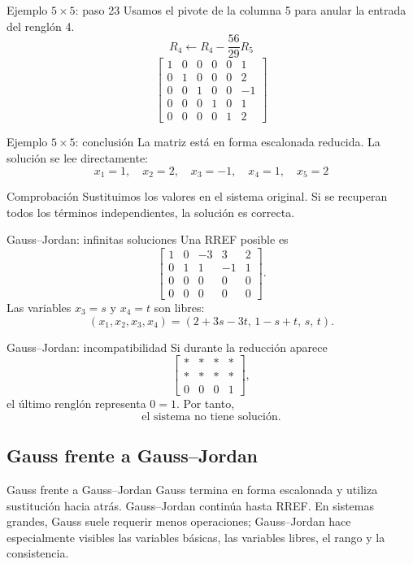 \documentclass[aspectratio=169,9pt]{beamer}
\theoremstyle{remark}
\begin{document}
\begin{frame}[t]{Ejemplo $5\times5$: paso 23}
Usamos el pivote de la columna 5 para anular la entrada del renglón 4.
\[
R_{4}\leftarrow R_{4}-\frac{56}{29}R_{5}
\]
\[
\left[\begin{array}{ccccc|c}
1 & 0 & 0 & 0 & 0 & 1\\
0 & 1 & 0 & 0 & 0 & 2\\
0 & 0 & 1 & 0 & 0 & -1\\
0 & 0 & 0 & 1 & 0 & 1\\
0 & 0 & 0 & 0 & 1 & 2
\end{array}\right]
\]
\end{frame}
\begin{frame}[t]{Ejemplo $5\times5$: conclusión}
La matriz está en forma escalonada reducida. La solución se lee directamente:
\[
\boxed{x_{1}=1,\quad x_{2}=2,\quad x_{3}=-1,\quad x_{4}=1,\quad x_{5}=2}
\]
\begin{block}{Comprobación}
Sustituimos los valores en el sistema original. Si se recuperan todos los términos independientes, la solución es correcta.
\end{block}
\end{frame}

\begin{frame}[t]{Gauss--Jordan: infinitas soluciones}
Una RREF posible es
\[
\left[\begin{array}{cccc|c}
1&0&-3&3&2\\
0&1&1&-1&1\\
0&0&0&0&0\\
0&0&0&0&0
\end{array}\right].
\]
Las variables \(x_3=s\) y \(x_4=t\) son libres:
\[
\boxed{(x_1,x_2,x_3,x_4)=(2+3s-3t,\,1-s+t,\,s,\,t)}.
\]
\end{frame}

\begin{frame}[t]{Gauss--Jordan: incompatibilidad}
Si durante la reducción aparece
\[
\left[\begin{array}{ccc|c}
*&*&*&*\\
*&*&*&*\\
0&0&0&1
\end{array}\right],
\]
el último renglón representa \(0=1\). Por tanto,
\[
\boxed{\text{el sistema no tiene solución}.}
\]
\end{frame}

\subsection{Gauss frente a Gauss--Jordan}
\begin{frame}[t]{Gauss frente a Gauss--Jordan}
Gauss termina en forma escalonada y utiliza sustitución hacia atrás. Gauss--Jordan continúa hasta RREF.
En sistemas grandes, Gauss suele requerir menos operaciones; Gauss--Jordan hace especialmente visibles
las variables básicas, las variables libres, el rango y la consistencia.
\end{frame}
\end{document}
